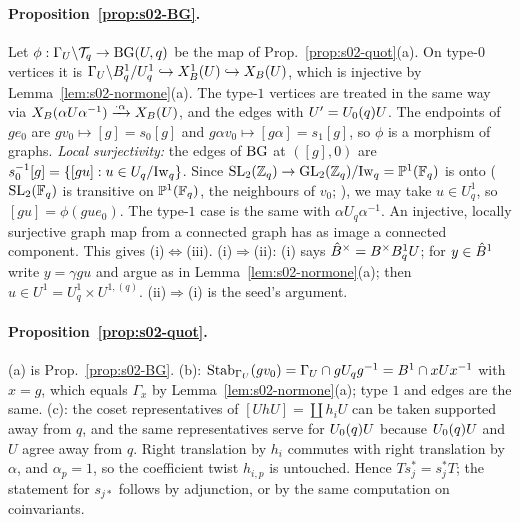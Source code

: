 \paragraph{Proposition~\ref{prop:s02-BG}.} Let $\phi:\Gamma_U\backslash\mathcal{T}_q\to\mathrm{BG}(U,q)$ be the map of
Prop.~\ref{prop:s02-quot}(a). On type-$0$ vertices it is $\Gamma_U\backslash B^1_q/U_q^1\hookrightarrow X^1_B(U)\hookrightarrow X_B(U)$,
which is injective by Lemma~\ref{lem:s02-normone}(a). The type-$1$ vertices are treated in the same way via
$X_B(\alpha U\alpha^{-1})\xrightarrow{\cdot\alpha}X_B(U)$, and the edges with $U'=U_0(q)U$. The endpoints of
$ge_0$ are $gv_0\mapsto[g]=s_0[g]$ and $g\alpha v_0\mapsto[g\alpha]=s_1[g]$, so $\phi$ is a morphism of graphs.
\emph{Local surjectivity:} the edges of $\mathrm{BG}$ at $([g],0)$ are $s_0^{-1}[g]=\{[gu]:u\in U_q/\mathrm{Iw}_q\}$. Since
$\mathrm{SL}_2(\mathbb{Z}_q)\to\mathrm{GL}_2(\mathbb{Z}_q)/\mathrm{Iw}_q=\mathbb P^1(\mathbb{F}_q)$ is onto ($\mathrm{SL}_2(\mathbb{F}_q)$ is transitive on $\mathbb P^1(\mathbb{F}_q)$, the neighbours of $v_0$; ), we may take $u\in U_q^1$, so $[gu]=\phi(gue_0)$.
The type-$1$ case is the same with $\alpha U_q\alpha^{-1}$. An injective, locally surjective graph map from a
connected graph has as image a connected component. This gives (i)$\Leftrightarrow$(iii).
(i)$\Rightarrow$(ii): (i) says $\hat{B}^\times=B^\times B^1_qU$; for $y\in\hat{B}^1$ write $y=\gamma gu$ and argue as in
Lemma~\ref{lem:s02-normone}(a); then $u\in U^1=U^1_q\times U^{1,(q)}$. (ii)$\Rightarrow$(i) is the seed's
argument.

\paragraph{Proposition~\ref{prop:s02-quot}.} (a) is Prop.~\ref{prop:s02-BG}. (b):
$\operatorname{Stab}_{\Gamma_U}(gv_0)=\Gamma_U\cap gU_qg^{-1}=B^1\cap xUx^{-1}$ with $x=g$, which equals $\Gamma_x$ by
Lemma~\ref{lem:s02-normone}(a); type $1$ and edges are the same. (c): the coset representatives of
$[UhU]=\coprod h_iU$ can be taken supported away from $q$, and the same representatives serve for $U_0(q)U$
because $U_0(q)U$ and $U$ agree away from $q$. Right translation by $h_i$ commutes with right translation by
$\alpha$, and $\alpha_p=1$, so the coefficient twist $h_{i,p}$ is untouched. Hence $T s_j^*=s_j^*T$; the
statement for $s_{j*}$ follows by adjunction, or by the same computation on coinvariants.

